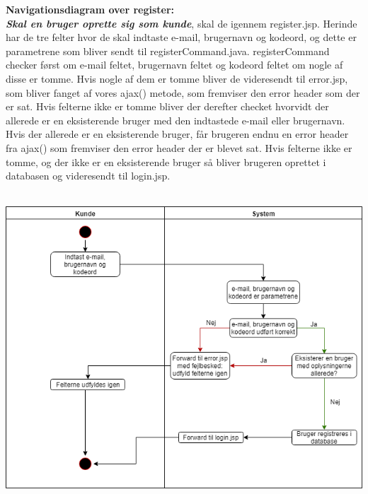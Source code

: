 \documentclass[11pt]{report}
\begin{document}
\noindent
\textbf{Navigationsdiagram over register:}\\
\textbf{\textit{Skal en bruger oprette sig som kunde}}, skal de igennem
register.jsp. Herinde har de tre felter hvor de skal indtaste e-mail,
brugernavn og kodeord, og dette er parametrene som bliver sendt til
registerCommand.java. registerCommand checker først om e-mail feltet,
brugernavn feltet og kodeord feltet om nogle af disse er tomme. Hvis
nogle af dem er tomme bliver de videresendt til error.jsp, som bliver
fanget af vores ajax() metode, som fremviser den error header som der
er sat. Hvis felterne ikke er tomme bliver der derefter checket
hvorvidt der allerede er en eksisterende bruger med den indtastede
e-mail eller brugernavn. Hvis der allerede er en eksisterende bruger,
får brugeren endnu en error header fra ajax() som fremviser den error
header der er blevet sat. Hvis felterne ikke er tomme, og der ikke er en eksisterende bruger så bliver brugeren oprettet i databasen og videresendt til login.jsp.\\\\ 
\begin{center}
\includegraphics[width=15cm]{RegisterCupCake.png}
\end{center}
\newpage
\end{document}
